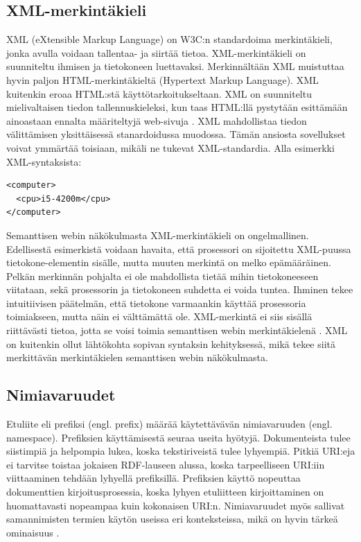 \documentclass[finnish, 12pt, a4paper, elec, utf8, pdfa, online]{aaltothesis}
\begin{document}
\subsection{XML-merkintäkieli}
XML (eXtensible Markup Language) on W3C:n standardoima merkintäkieli, jonka avulla voidaan tallentaa- ja siirtää tietoa. XML-merkintäkieli on suunniteltu ihmisen ja tietokoneen luettavaksi. Merkinnältään XML muistuttaa hyvin paljon HTML-merkintäkieltä (Hypertext Markup Language). XML kuitenkin eroaa HTML:stä käyttötarkoitukseltaan. XML on suunniteltu mielivaltaisen tiedon tallennuskieleksi, kun taas HTML:llä pystytään esittämään ainoastaan ennalta määriteltyjä web-sivuja \cite{IEEE_XML}. XML mahdollistaa tiedon välittämisen yksittäisessä stanardoidussa muodossa. Tämän ansiosta sovellukset voivat ymmärtää toisiaan, mikäli ne tukevat XML-standardia. Alla esimerkki XML-syntaksista:
\vspace{0.3cm}
\begin{lstlisting}[style=codeblock,caption={XML-syntaksiesimerkki.},captionpos=b,label={xml-esim}]
<computer>
  <cpu>i5-4200m</cpu>
</computer>
\end{lstlisting}

 Semanttisen webin näkökulmasta XML-merkintäkieli on ongelmallinen. Edellisestä esimerkistä voidaan havaita, että prosessori on sijoitettu XML-puussa tietokone-elementin sisälle, mutta muuten merkintä on melko epämääräinen. Pelkän merkinnän pohjalta ei ole mahdollista tietää mihin tietokoneeseen viitataan, sekä prosessorin ja tietokoneen suhdetta ei voida tuntea. Ihminen tekee intuitiivisen päätelmän, että tietokone varmaankin käyttää prosessoria toimiakseen, mutta näin ei välttämättä ole. XML-merkintä ei siis sisällä riittävästi tietoa, jotta se voisi toimia semanttisen webin merkintäkielenä \cite{IEEE_XML}. XML on kuitenkin ollut lähtökohta sopivan syntaksin kehityksessä, mikä tekee siitä merkittävän merkintäkielen semanttisen webin näkökulmasta.

 \subsection{Nimiavaruudet}
 Etuliite eli prefiksi (engl. prefix) määrää käytettävävän nimiavaruuden (engl. namespace). Prefiksien käyttämisestä seuraa useita hyötyjä. Dokumenteista tulee siistimpiä ja helpompia lukea, koska tekstiriveistä tulee lyhyempiä. Pitkiä URI:eja ei tarvitse toistaa jokaisen RDF-lauseen alussa, koska tarpeelliseen URI:iin viittaaminen tehdään lyhyellä prefiksillä. Prefiksien käyttö nopeuttaa dokumenttien kirjoitusprosessia, koska lyhyen etuliitteen kirjoittaminen on huomattavasti nopeampaa kuin kokonaisen URI:n. Nimiavaruudet myös sallivat samannimisten termien käytön useissa eri konteksteissa, mikä on hyvin tärkeä ominaisuus \cite{Antoniou}.
\end{document}
